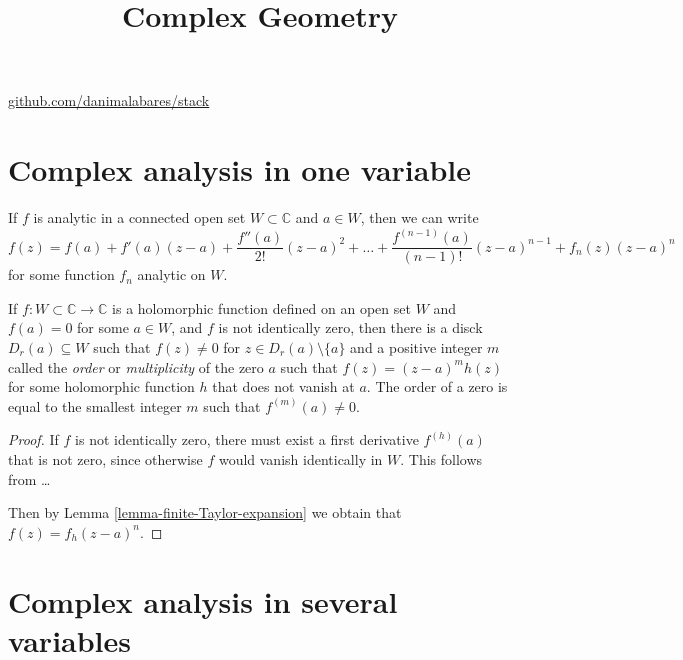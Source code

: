 



\title{Complex Geometry}
\maketitle

\label{section-phantom}
\hfill
\href{http://github.com/danimalabares/stack}{github.com/danimalabares/stack}

\tableofcontents

\section{Complex analysis in one variable}
\label{section-complex-analysis-in-one-variable}

\begin{lemma}
\label{lemma-finite-Taylor-expansion}
If $f$ is analytic in a connected open set $W\subset\mathbb{C}$ and $a \in W$,
then we can write
$$
f(z)=f(a)+f'(a)(z-a)+\frac{f''(a)}{2!}(z-a)^2+\ldots
+\frac{f^{(n-1)}(a)}{(n-1)!}(z-a)^{n-1}+f_n(z)(z-a)^n
$$
for some function $f_n$ analytic on $W$.
\end{lemma}

\begin{theorem}
\label{theorem-zeroes-are-isolated-and-have-finite-order}
If $f:W\subset\mathbb{C}\to \mathbb{C}$ is a holomorphic function defined on an
open set $W$ and $f(a)=0$ for some $a\in W$, and $f$ is not identically zero,
then there is a disck $D_r(a)\subseteq W$ such that $f(z)\neq 0$ for $z \in
D_r(a)\setminus\{a\}$ and a positive integer $m$ called the {\it order} or
{\it multiplicity} of the zero $a$ such that  $f(z)=(z-a)^mh(z)$ for some
holomorphic function $h$ that does not vanish at $a$. The order of a zero is
equal to the smallest integer $m$ such that $f^{(m)}(a)\neq 0$.
\end{theorem}

\begin{proof}
If $f$ is not identically zero, there must exist a first derivative $f^{
(h)}(a)$ that is not zero, since otherwise $f$ would vanish identically in $W$.
This follows from … 

Then by Lemma \ref{lemma-finite-Taylor-expansion} we obtain that
$f(z)=f_h(z-a)^n$.
\end{proof}

\section{Complex analysis in several variables}
\label{section-complex-analysis-in-several-variables}

